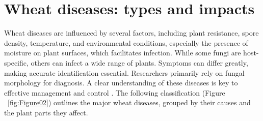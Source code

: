    
    
    
    




\section{Wheat diseases: types and impacts}

Wheat diseases are influenced by several factors, including plant resistance, spore density, temperature, and environmental conditions, especially the presence of moisture on plant surfaces, which facilitates infection. While some fungi are host-specific, others can infect a wide range of plants. Symptoms can differ greatly, making accurate identification essential. Researchers primarily rely on fungal morphology for diagnosis. A clear understanding of these diseases is key to effective management and control \protect\parencite{haider2021wheat}. The following classification (Figure ~\ref{fig:Figure02}) outlines the major wheat diseases, grouped by their causes and the plant parts they affect.

